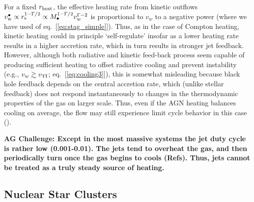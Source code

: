 \documentclass[usenatbib,fleqn]{mn2e}
\begin{document}
For a fixed $r_{\rm heat}$, the effective heating rate from kinetic outflows $v_{\rm w}^{\bullet} \propto r_{\rm s}^{1-\Gamma/2} \propto M_{\bullet}^{1-\Gamma/2}v_{w}^{\Gamma-2}$ is proportional to $v_{w}$
to a negative power (where we have used of eq.~[\ref{eq:stag_simple}]).  Thus, as in the case of Compton heating, kinetic heating could in principle  `self-regulate' insofar as a lower heating rate results in a higher accretion rate, which in turn results in stronger jet feedback.  
However, although both radiative and kinetic feed-back process seem capable of producing sufficient heating to offset radiative cooling and prevent instability (e.g., $v_w \gtrsim v_{\rm TI}$; eq.~[\ref{eq:cooling3}]), this is somewhat misleading because black hole feedback depends on the central accretion rate, which (unlike stellar feedback) does not respond instantaneously to changes in the thermodynamic properties of the gas on larger scale.  Thus, even if the AGN heating balances cooling on average, the flow may still experience limit cycle behavior in this case (\citealt{Yuan&Li11}).   


{\bf AG Challenge: Except in the most massive systems the jet duty
  cycle is rather low (0.001-0.01). The jets tend to overheat the gas,
  and then periodically turn once the gas begins to cools
  (Refs). Thus, jets cannot be treated as a truly steady source of
  heating. 
}



\subsection{Nuclear Star Clusters}
\end{document}
